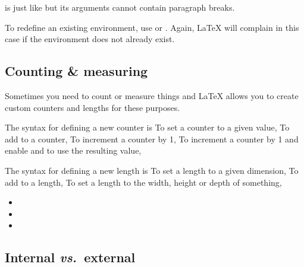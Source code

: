  is just like  but its arguments cannot contain paragraph breaks.

To redefine an existing environment, use  or .
Again, \LaTeX{} will complain in this case if the environment does not already exist.

\subsection{Counting \& measuring}\label{subsec:cntmsr}


Sometimes you need to count or measure things and \LaTeX{} allows you to create custom counters and lengths for these purposes.

The syntax for defining a new counter is
To set a counter to a given value,
To add to a counter,
To increment a counter by 1,
To increment a counter by 1 and enable  and  to use the resulting value,

The syntax for defining a new length is
To set a length to a given dimension,
To add to a length,
To set a length to the width, height or depth of something,
\begin{itemize}
  \item {}
  \item {}
  \item {}
\end{itemize}


\subsection{Internal \protect\emph{vs.}\ external}\label{subsec:intext}


